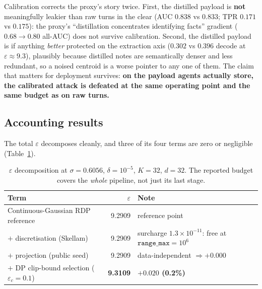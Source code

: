 \documentclass[pdflatex,sn-mathphys-num,12pt]{sn-jnl}
\theoremstyle{thmstyleone}%
\theoremstyle{thmstyletwo}%
\theoremstyle{thmstylethree}%
\newcommand{\eps}{\varepsilon}
\begin{document}
Calibration corrects the proxy's story twice. First, the distilled payload is \textbf{not}
meaningfully leakier than raw turns in the clear (AUC $0.838$ vs $0.833$; TPR $0.171$ vs
$0.175$): the proxy's ``distillation concentrates identifying facts'' gradient
($0.68 \to 0.80$ all-AUC) does not survive calibration. Second, the distilled payload is if
anything \emph{better} protected on the extraction axis ($0.302$ vs $0.396$ decode at
$\eps \approx 9.3$), plausibly because distilled notes are semantically denser and less
redundant, so a noised centroid is a worse pointer to any one of them. The claim that matters
for deployment survives: \textbf{on the payload agents actually store, the calibrated attack is
defeated at the same operating point and the same budget as on raw turns.}

\subsection{Accounting results}\label{sec:accounting-results}

The total $\eps$ decomposes cleanly, and three of its four terms are zero or negligible
(Table~\ref{tab:eps-decomp}).

\begin{table}[t]
  \centering
  \caption{$\eps$ decomposition at $\sigma = 0.6056$, $\delta = 10^{-5}$, $K = 32$,
  $d = 32$. The reported budget covers the \emph{whole} pipeline, not just its last stage.}
  \label{tab:eps-decomp}
  \footnotesize
  \begin{tabular}{@{}lrl@{}}
    \toprule
    Term & $\eps$ & Note \\
    \midrule
    Continuous-Gaussian RDP reference   & 9.2909          & reference point \\
    $+$ discretisation (Skellam)        & 9.2909          & surcharge $1.3 \times 10^{-11}$: free at $\texttt{range\_max} = 10^{6}$ \\
    $+$ projection (public seed)        & 9.2909          & data-independent $\Rightarrow +0.000$ \\
    $+$ DP clip-bound selection ($\eps_c = 0.1$) & \textbf{9.3109} & \textbf{$+0.020$ (0.2\%)} \\
    \bottomrule
  \end{tabular}
\end{table}
\end{document}
